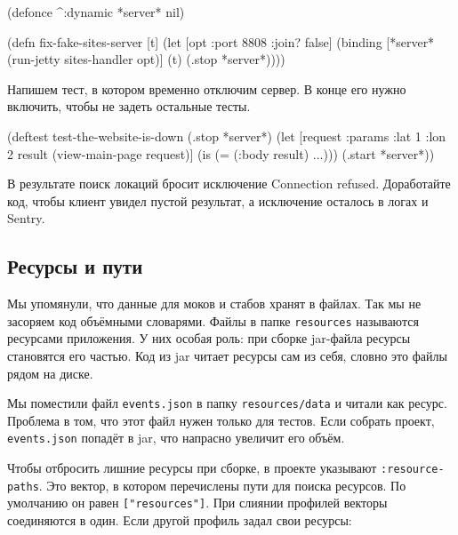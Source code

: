 \else

\begin{english}
  \begin{clojure}
(defonce ^:dynamic *server* nil)

(defn fix-fake-sites-server [t]
  (let [opt {:port 8808 :join? false}]
    (binding [*server*
              (run-jetty sites-handler opt)]
      (t)
      (.stop *server*))))
  \end{clojure}
\end{english}

\fi

Напишем тест, в котором временно отключим сервер. В конце его нужно включить,
чтобы не задеть остальные тесты.

\begin{english}
  \begin{clojure}
(deftest test-the-website-is-down
  (.stop *server*)
  (let [request {:params {:lat 1 :lon 2}}
        result (view-main-page request)]
    (is (= (:body result) {...})))
  (.start *server*))
  \end{clojure}
\end{english}

В результате поиск локаций бросит исключение Connection refused. Доработайте
код, чтобы клиент увидел пустой результат, а исключение осталось в логах и
Sentry.

\subsection{Ресурсы и пути}

\label{resources}


Мы упомянули, что данные для моков и стабов хранят в файлах. Так мы не засоряем
код объёмными словарями. Файлы в папке \verb|resources| называются ресурсами
приложения. У них особая роль: при сборке jar-файла ресурсы становятся его
частью. Код из jar читает ресурсы сам из себя, словно это файлы рядом на диске.

Мы поместили файл \verb|events.json| в папку \verb|resources/data| и читали как
ресурс. Проблема в том, что этот файл нужен только для тестов. Если собрать
проект, \verb|events.json| попадёт в jar, что напрасно увеличит его объём.

Чтобы отбросить лишние ресурсы при сборке, в проекте указывают
\verb|:resource-paths|. Это вектор, в котором перечислены пути для поиска
ресурсов. По умолчанию он равен \verb|["resources"]|. При слиянии профилей
векторы соединяются в один. Если другой профиль задал свои ресурсы:

